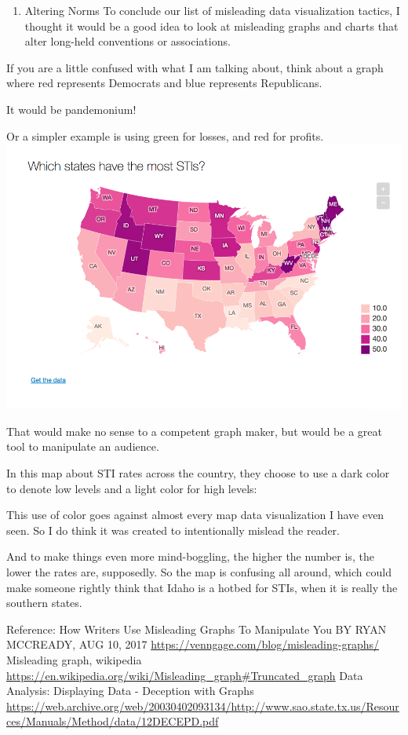 \documentclass[]{book}
\providecommand{\tightlist}{%
  \setlength{\itemsep}{0pt}\setlength{\parskip}{0pt}}
\theoremstyle{definition}
\theoremstyle{definition}
\theoremstyle{definition}
\theoremstyle{remark}
\begin{document}
\begin{enumerate}
\def\labelenumi{\arabic{enumi}.}
\setcounter{enumi}{4}
\tightlist
\item
  Altering Norms To conclude our list of misleading data visualization
  tactics, I thought it would be a good idea to look at misleading
  graphs and charts that alter long-held conventions or associations.
\end{enumerate}

If you are a little confused with what I am talking about, think about a
graph where red represents Democrats and blue represents Republicans.

It would be pandemonium!

Or a simpler example is using green for losses, and red for profits.
\includegraphics{images/5.misleading-graphs-24.png}

That would make no sense to a competent graph maker, but would be a
great tool to manipulate an audience.

In this map about STI rates across the country, they choose to use a
dark color to denote low levels and a light color for high levels:

This use of color goes against almost every map data visualization I
have even seen. So I do think it was created to intentionally mislead
the reader.

And to make things even more mind-boggling, the higher the number is,
the lower the rates are, supposedly. So the map is confusing all around,
which could make someone rightly think that Idaho is a hotbed for STIs,
when it is really the southern states.

Reference: How Writers Use Misleading Graphs To Manipulate You BY RYAN
MCCREADY, AUG 10, 2017
\url{https://venngage.com/blog/misleading-graphs/} Misleading graph,
wikipedia
\url{https://en.wikipedia.org/wiki/Misleading_graph\#Truncated_graph}
Data Analysis: Displaying Data - Deception with Graphs
\url{https://web.archive.org/web/20030402093134/http://www.sao.state.tx.us/Resources/Manuals/Method/data/12DECEPD.pdf}
\end{document}
